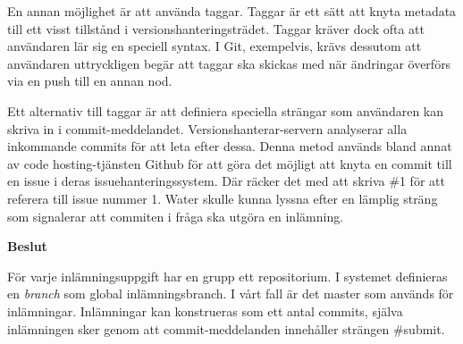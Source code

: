 En annan möjlighet är att använda taggar. Taggar är ett sätt att knyta metadata till ett visst tillstånd i versionshanteringsträdet. Taggar kräver dock ofta att användaren lär sig en speciell syntax. I Git, exempelvis, krävs dessutom att användaren uttryckligen begär att taggar ska skickas med när ändringar överförs via en push till en annan nod.

Ett alternativ till taggar är att definiera speciella strängar som användaren kan skriva in i commit-meddelandet. Versionshanterar-servern analyserar alla inkommande commits för att leta efter dessa. Denna metod används bland annat av code hosting-tjänsten Github för att göra det möjligt att knyta en commit till en issue i deras issuehanteringssystem. Där räcker det med att skriva \#1 för att referera till issue nummer 1. Water skulle kunna lyssna efter en lämplig sträng som signalerar att commiten i fråga ska utgöra en inlämning.

\begin{flushright}
  
  \textbf{Beslut}
  
  För varje inlämningsuppgift har en grupp ett repositorium. I systemet definieras en \emph{branch} som global inlämningsbranch. I vårt fall är det master som används för inlämningar. Inlämningar kan konstrueras som ett antal commits, själva inlämningen sker genom att commit-meddelanden innehåller strängen \#submit.
\end{flushright}
